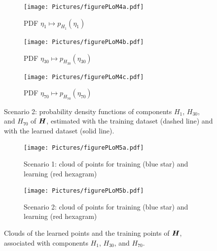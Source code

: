\begin{figure}[!htb]
    \centering
    \begin{subfigure}[b]{0.33\textwidth}
    \centering
        \texttt{[image: Pictures/figurePLoM4a.pdf]}
        \caption{PDF $\eta_1\mapsto p_{H_1}(\eta_1)$}
        \label{fig:figurePLoM4a}
    \end{subfigure}
    \centering
    \begin{subfigure}[b]{0.33\textwidth}
    \centering
        \texttt{[image: Pictures/figurePLoM4b.pdf]}
        \caption{PDF $\eta_{30}\mapsto p_{H_{30}}(\eta_{30})$}
        \label{fig:figurePLoM4b}
    \end{subfigure}
    \centering
    \begin{subfigure}[b]{0.33\textwidth}
    \centering
        \texttt{[image: Pictures/figurePLoM4c.pdf]}
        \caption{PDF $\eta_{70}\mapsto p_{H_{70}}(\eta_{70})$}
        \label{fig:figurePLoM4c}
    \end{subfigure}
    \caption{Scenario 2: probability density functions of components $H_1$, $H_{30}$, and $H_{70}$ of ${\boldsymbol{H}}$, estimated with the training dataset (dashed line) and with the learned dataset (solid line).}
    \label{fig:figurePLoM4}
\end{figure}
%
\begin{figure}[!htb]
    \centering
    \begin{subfigure}[b]{0.45\textwidth}
    \centering
        \texttt{[image: Pictures/figurePLoM5a.pdf]}
        \caption{Scenario 1: cloud of points for training (blue star) and learning (red hexagram)}
        \label{fig:figurePLoM5a}
    \end{subfigure}
    \centering
    \begin{subfigure}[b]{0.45\textwidth}
    \centering
        \texttt{[image: Pictures/figurePLoM5b.pdf]}
        \caption{Scenario 2: cloud of points for training (blue star) and learning (red hexagram)}
        \label{fig:figurePLoM5b}
    \end{subfigure}
    \caption{Clouds of the learned points and the training points of ${\boldsymbol{H}}$, associated with components $H_1$, $H_{30}$, and $H_{70}$.}
    \label{fig:figurePLoM5}
\end{figure}
%
